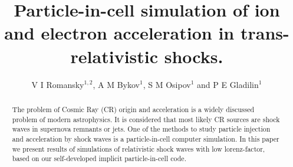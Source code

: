 \documentclass[a4paper]{jpconf}
\begin{document}
\title{Particle-in-cell simulation of ion and electron acceleration in trans-relativistic shocks.}

\author{V I Romansky$^{1,2}$, A M Bykov$^1$, S M Osipov$^1$ and P E Gladilin$^1$}

\address{$^1$ Ioffe Institute, 26 Politekhnicheskaya st., St. Petersburg 194021, Russia}
\address{$^2$ 
Sternberg Astronomical Institute, Moscow State University
 Universitetsky pr., 13, Moscow 119234, Russia}


\begin{abstract}
The problem of Cosmic Ray (CR) origin and acceleration is a widely discussed problem of
modern astrophysics. It is considered that most likely CR sources are 
shock waves in supernova remnants or jets. One of the methods to study particle injection and acceleration by shock
waves is a particle-in-cell computer simulation. In this paper we present results of
simulations of relativistic shock waves with low lorenz-factor, based on our self-developed implicit particle-in-cell code. 
\end{abstract}





\end{document}
